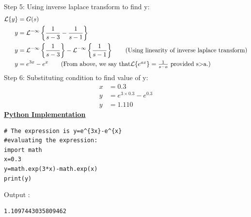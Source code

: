 \documentclass{article}
\begin{document}
Step 5: Using inverse laplace transform to find y:
\begin{align*}
   \mathcal{L}\{y\}&=G(s)\\
                  y &=\mathcal{L^{-1}}\left\{\frac{1}{s-3}-\frac{1}{s-1}\right\}\\
                  y &=\mathcal{L^{-1}}\left\{\frac{1}{s-3}\right\}-\mathcal{L^{-1}}\left\{\frac{1}{s-1}\right\}\tag{Using linearity of inverse laplace transform}\\
                  y&=e^{3x}-e^{x}\tag{From above, we say that$\mathcal{L}\{e^{ax}\}=\frac{1}{s-a}$ provided s$>$a.}\\
\end{align*}
Step 6: Substituting condition to find value of y:\\
\begin{align*}
    x&=0.3\tag{given}\\
    y&=e^{3\times0.3}-e^{0.3}\\
    y&=1.110
\end{align*}
\large\underline{\textbf{Python Implementation}}\\
\begin{lstlisting}[style=pycode,frame=single]
# The expression is y=e^{3x}-e^{x}
#evaluating the expression:
import math
x=0.3
y=math.exp(3*x)-math.exp(x)
print(y)
\end{lstlisting}
Output :\\
\begin{lstlisting}[style=terminal]
1.1097443035809462
\end{lstlisting}
\end{document}
